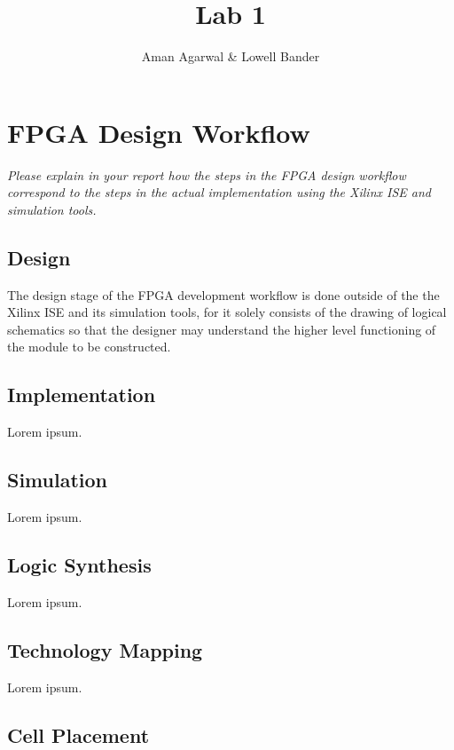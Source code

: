 \documentclass[]{article}
\newcommand{\subtitle}[1]{%
  \posttitle{%
    \par\end{center}
    \begin{center}\large#1\end{center}
    \vskip0.5em}%
}
\begin{document}
\title{Lab 1}
\subtitle{CS M152A}
\author{Aman Agarwal \& Lowell Bander}

\maketitle

\section{FPGA Design Workflow}

\textit{Please explain in your report how the steps in the FPGA design workflow correspond to the steps in the actual implementation using the Xilinx ISE and simulation tools.}\\


\subsection{Design}

The design stage of the FPGA development workflow is done outside of the the Xilinx ISE and its simulation tools, for it solely consists of the drawing of logical schematics so that the designer may understand the higher level functioning of the module to be constructed.

\subsection{Implementation}

Lorem ipsum.

\subsection{Simulation}

Lorem ipsum.

\subsection{Logic Synthesis}

Lorem ipsum.

\subsection{Technology Mapping}

Lorem ipsum.

\subsection{Cell Placement}
\end{document}
